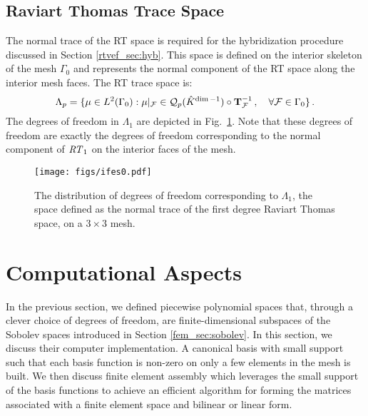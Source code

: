 \documentclass[../doc.tex]{subfiles}
\begin{document}
\subsection{Raviart Thomas Trace Space}
The normal trace of the RT space is required for the hybridization procedure discussed in Section \ref{rtvef_sec:hyb}. This space is defined on the interior skeleton of the mesh $\Gamma_0$ and represents the normal component of the RT space along the interior mesh faces. 
The RT trace space is: 
	\begin{equation}
		\Lambda_p = \{ \mu \in L^2(\Gamma_0) : \mu|_\mathcal{F} \in \mathcal{Q}_p(\hat{K}^{\dim-1}) \circ \boldsymbol{\mathrm{T}}_\mathcal{F}^{-1} \,, \quad \forall \mathcal{F} \in \Gamma_0 \} \,. 
	\end{equation}
The degrees of freedom in $\Lambda_1$ are depicted in Fig.~\ref{fem:ifes}. Note that these degrees of freedom are exactly the degrees of freedom corresponding to the normal component of $\mathit{RT}_1$ on the interior faces of the mesh. 
\begin{figure}
\centering
\texttt{[image: figs/ifes0.pdf]}
\caption{The distribution of degrees of freedom corresponding to $\Lambda_1$, the space defined as the normal trace of the first degree Raviart Thomas space, on a $3\times 3$ mesh. }
\label{fem:ifes}
\end{figure}

\section{Computational Aspects}
In the previous section, we defined piecewise polynomial spaces that, through a clever choice of degrees of freedom, are finite-dimensional subspaces of the Sobolev spaces introduced in Section \ref{fem_sec:sobolev}. In this section, we discuss their computer implementation. A canonical basis with small support such that each basis function is non-zero on only a few elements in the mesh is built. We then discuss finite element assembly which leverages the small support of the basis functions to achieve an efficient algorithm for forming the matrices associated with a finite element space and bilinear or linear form. 
\end{document}
